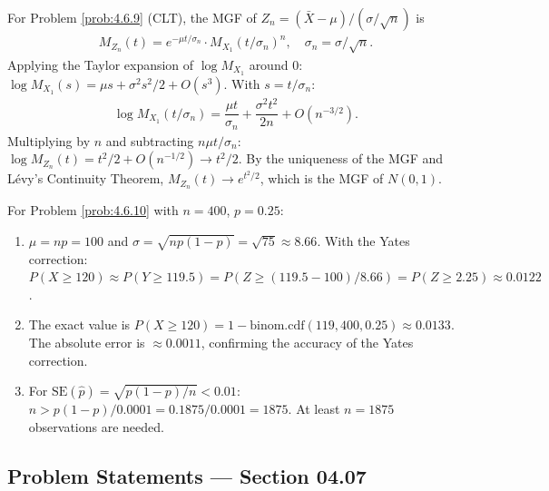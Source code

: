 \begin{solucion}
	\label{sol:4.6.9}
	For Problem \ref{prob:4.6.9} (CLT), the MGF of $Z_{n} = (\bar{X} - \mu)/(\sigma/\sqrt{n})$ is
	\begin{align*}
		M_{Z_{n}}(t) = e^{-\mu t/\sigma_n} \cdot M_{X_{1}}(t/\sigma_n)^{n}, \quad \sigma_n = \sigma/\sqrt{n}.
	\end{align*}
	Applying the Taylor expansion of $\log M_{X_{1}}$ around 0: $\log M_{X_{1}}(s) = \mu s + \sigma^{2}s^{2}/2 + O(s^{3})$. With $s = t/\sigma_n$:
	\begin{align*}
		\log M_{X_{1}}(t/\sigma_n) = \dfrac{\mu t}{\sigma_n} + \dfrac{\sigma^{2}t^{2}}{2n} + O(n^{-3/2}).
	\end{align*}
	Multiplying by $n$ and subtracting $n\mu t/\sigma_n$: $\log M_{Z_{n}}(t) = t^{2}/2 + O(n^{-1/2}) \to t^{2}/2$. By the uniqueness of the MGF and Lévy's Continuity Theorem, $M_{Z_{n}}(t) \to e^{t^{2}/2}$, which is the MGF of $N(0, 1)$. \quad \qedhere
\end{solucion}

\begin{solucion}
	\label{sol:4.6.10}
	For Problem \ref{prob:4.6.10} with $n = 400$, $p = 0.25$:
	\begin{enumerate}
		\item $\mu = np = 100$ and $\sigma = \sqrt{np(1-p)} = \sqrt{75} \approx 8.66$. With the Yates correction: $P(X \ge 120) \approx P(Y \ge 119.5) = P(Z \ge (119.5 - 100)/8.66) = P(Z \ge 2.25) \approx 0.0122$.
		\item The exact value is $P(X \ge 120) = 1 - \text{binom.cdf}(119, 400, 0.25) \approx 0.0133$. The absolute error is $\approx 0.0011$, confirming the accuracy of the Yates correction.
		\item For $\text{SE}(\hat{p}) = \sqrt{p(1-p)/n} < 0.01$: $n > p(1-p)/0.0001 = 0.1875/0.0001 = 1875$. At least $n = 1875$ observations are needed.
	\end{enumerate}
\end{solucion}


\subsection*{Problem Statements --- Section 04.07}

